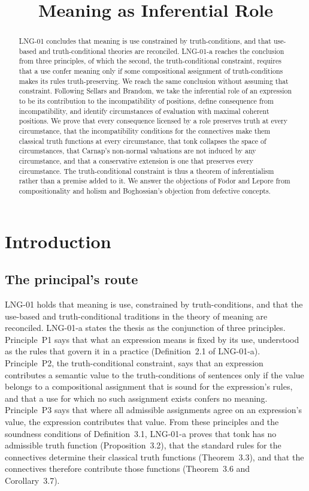 \documentclass{situationist-preprint}
\title{Meaning as Inferential Role}
\begin{document}
\maketitle

\begin{abstract}
LNG-01 concludes that meaning is use constrained by truth-conditions, and that use-based and truth-conditional theories are reconciled. LNG-01-a reaches the conclusion from three principles, of which the second, the truth-conditional constraint, requires that a use confer meaning only if some compositional assignment of truth-conditions makes its rules truth-preserving. We reach the same conclusion without assuming that constraint. Following Sellars and Brandom, we take the inferential role of an expression to be its contribution to the incompatibility of positions, define consequence from incompatibility, and identify circumstances of evaluation with maximal coherent positions. We prove that every consequence licensed by a role preserves truth at every circumstance, that the incompatibility conditions for the connectives make them classical truth functions at every circumstance, that tonk collapses the space of circumstances, that Carnap's non-normal valuations are not induced by any circumstance, and that a conservative extension is one that preserves every circumstance. The truth-conditional constraint is thus a theorem of inferentialism rather than a premise added to it. We answer the objections of Fodor and Lepore from compositionality and holism and Boghossian's objection from defective concepts.
\end{abstract}

\section{Introduction}\label{s:intro}

\subsection{The principal's route}

LNG-01 holds that meaning is use, constrained by truth-conditions, and that the use-based and truth-conditional traditions in the theory of meaning are reconciled. LNG-01-a states the thesis as the conjunction of three principles. Principle~P1 says that what an expression means is fixed by its use, understood as the rules that govern it in a practice (Definition~2.1 of LNG-01-a). Principle~P2, the truth-conditional constraint, says that an expression contributes a semantic value to the truth-conditions of sentences only if the value belongs to a compositional assignment that is sound for the expression's rules, and that a use for which no such assignment exists confers no meaning. Principle~P3 says that where all admissible assignments agree on an expression's value, the expression contributes that value. From these principles and the soundness conditions of Definition~3.1, LNG-01-a proves that tonk has no admissible truth function (Proposition~3.2), that the standard rules for the connectives determine their classical truth functions (Theorem~3.3), and that the connectives therefore contribute those functions (Theorem~3.6 and Corollary~3.7).
\end{document}
